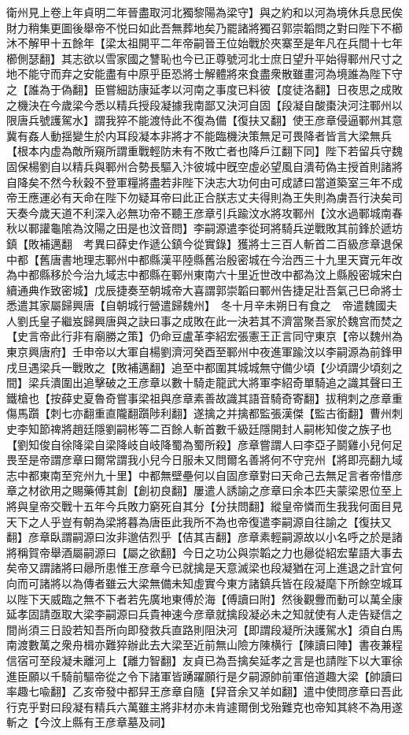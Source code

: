 衛州見上卷上年貞明二年晉盡取河北獨黎陽為梁守】與之約和以河為境休兵息民俟財力稍集更圖後舉帝不悦曰如此吾無葬地矣乃罷諸將獨召郭崇韜問之對曰陛下不櫛沐不解甲十五餘年【梁太祖開平二年帝嗣晉王位始戰於夾寨至是年凡在兵間十七年櫛側瑟翻】其志欲以雪家國之讐恥也今已正尊號河北士庶日望升平始得鄆州尺寸之地不能守而弃之安能盡有中原乎臣恐將士解體將來食盡衆散雖畫河為境誰為陛下守之【誰為于偽翻】臣嘗細訪康延孝以河南之事度已料彼【度徒洛翻】日夜思之成敗之機決在今歲梁今悉以精兵授段凝據我南鄙又決河自固【段凝自酸棗決河注鄆州以限唐兵號護駕水】謂我猝不能渡恃此不復為備【復扶又翻】使王彦章侵逼鄆州其意冀有姦人動揺變生於内耳段凝本非將才不能臨機決策無足可畏降者皆言大梁無兵【根本内虚為敵所窺所謂重戰輕防未有不敗亡者也降戶江翻下同】陛下若留兵守魏固保楊劉自以精兵與鄆州合勢長驅入汴彼城中旣空虛必望風自潰苟偽主授首則諸將自降矣不然今秋穀不登軍糧將盡若非陛下決志大功何由可成諺曰當道築室三年不成帝王應運必有天命在陛下勿疑耳帝曰此正合朕志丈夫得則為王失則為虜吾行決矣司天奏今歲天道不利深入必無功帝不聽王彦章引兵踰汶水將攻鄆州【汶水過鄆城南春秋以鄆讙龜隂為汶陽之田是也汶音問】李嗣源遣李從珂將騎兵逆戰敗其前鋒於遞坊鎮【敗補邁翻　考異曰薛史作遞公鎮今從實錄】獲將士三百人斬首二百級彦章退保中都【舊唐書地理志鄆州中都縣漢平陸縣舊治殷密城在今治西三十九里天寶元年改為中都縣移於今治九域志中都縣在鄆州東南六十里近世改中都為汶上縣殷密城宋白續通典作致密城】戊辰捷奏至朝城帝大喜謂郭崇韜曰鄆州告捷足壯吾氣己巳命將士悉遣其家屬歸興唐【自朝城行營遣歸魏州】　冬十月辛未朔日有食之　帝遣魏國夫人劉氏皇子繼岌歸興唐與之訣曰事之成敗在此一決若其不濟當聚吾家於魏宫而焚之【史言帝此行非有廟勝之策】仍命豆盧革李紹宏張憲王正言同守東京【帝以魏州為東京興唐府】壬申帝以大軍自楊劉濟河癸酉至鄆州中夜進軍踰汶以李嗣源為前鋒甲戌旦遇梁兵一戰敗之【敗補邁翻】追至中都圍其城城無守備少頃【少頃謂少頃刻之間】梁兵潰圍出追擊破之王彦章以數十騎走龍武大將軍李紹奇單騎追之識其聲曰王鐵槍也【按薛史夏魯奇嘗事梁祖與彦章素善故識其語音騎奇寄翻】拔稍刺之彦章重傷馬躓【刺七亦翻重直隴翻躓陟利翻】遂擒之并擒都監張漢傑【監古銜翻】曹州刺史李知節禆將趙廷隱劉嗣彬等二百餘人斬首數千級廷隱開封人嗣彬知俊之族子也【劉知俊自徐降梁自梁降岐自岐降蜀為蜀所殺】彦章嘗謂人曰李亞子鬬雞小兒何足畏至是帝謂彦章曰爾常謂我小兒今日服未又問爾名善將何不守兖州【將即亮翻九域志中都東南至兖州九十里】中都無壁壘何以自固彦章對曰天命己去無足言者帝惜彦章之材欲用之賜藥傅其創【創初良翻】屢遣人誘諭之彦章曰余本匹夫蒙梁恩位至上將與皇帝交戰十五年今兵敗力窮死自其分【分扶問翻】縱皇帝憐而生我我何面目見天下之人乎豈有朝為梁將暮為唐臣此我所不為也帝復遣李嗣源自往諭之【復扶又翻】彦章臥謂嗣源曰汝非邈佶烈乎【佶其吉翻】彦章素輕嗣源故以小名呼之於是諸將稱賀帝舉酒屬嗣源曰【屬之欲翻】今日之功公與崇韜之力也曏從紹宏輩語大事去矣帝又謂諸將曰曏所患惟王彦章今已就擒是天意滅梁也段凝猶在河上進退之計宜何向而可諸將以為傳者雖云大梁無備未知虛實今東方諸鎮兵皆在段凝麾下所餘空城耳以陛下天威臨之無不下者若先廣地東傅於海【傅讀曰附】然後觀釁而動可以萬全康延孝固請亟取大梁李嗣源曰兵貴神速今彦章就擒段凝必未之知就使有人走告疑信之間尚須三日設若知吾所向即發救兵直路則阻決河【即謂段凝所決護駕水】須自白馬南渡數萬之衆舟楫亦難猝辦此去大梁至近前無山險方陳横行【陳讀曰陣】書夜兼程信宿可至段凝未離河上【離力智翻】友貞已為吾擒矣延孝之言是也請陛下以大軍徐進臣願以千騎前驅帝從之令下諸軍皆踴躍願行是夕嗣源帥前軍倍道趣大梁【帥讀曰率趣七喩翻】乙亥帝發中都舁王彦章自隨【舁音余又羊如翻】遣中使問彦章曰吾此行克乎對曰段凝有精兵六萬雖主將非材亦未肯遽爾倒戈殆難克也帝知其終不為用遂斬之【今汶上縣有王彦章墓及祠】